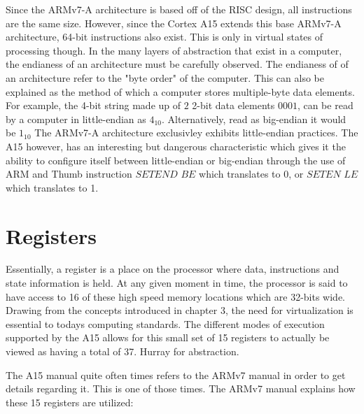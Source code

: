 \documentclass[12pt]{scrreprt}
\begin{document}
	Since the ARMv7-A architecture is based off of the RISC design, all instructions are the same size. However, since the Cortex A15 extends
	this base ARMv7-A architecture, 64-bit instructions also exist. This is only in virtual states of processing though.
	In the many layers of abstraction that exist in a computer, the endianess of an architecture must be carefully observed. The endianess of
	of an architecture refer to the "byte order" of the computer. This can also be explained as the method of which a computer stores
	multiple-byte data elements. For example, the 4-bit string made up of $2$ 2-bit data elements $0001$, can be read by a computer in little-endian as $4_{10}$. Alternatively, read as big-endian it would be $1_{10}$ The ARMv7-A architecture exclusivley exhibits little-endian practices. The A15 however, has an interesting but dangerous characteristic which gives it the ability to configure itself between little-endian or big-endian through the use of ARM and Thumb instruction $SETEND$ $BE$ which translates to 0, or $SETEN$ $LE$ which translates to 1.



{\let\clearpage\relax\chapter{Registers}}

	Essentially, a register is a place on the processor where data, instructions and state information is held.
	At any given moment in time, the processor is said to have access to 16 of these high speed memory locations which are 32-bits wide.
	Drawing from the concepts introduced in chapter 3, the need for virtualization is essential to todays computing standards.
	The different modes of execution supported by the A15 allows for this small set of 15 registers to actually be viewed as having a total of 37.
	Hurray for abstraction.

	The A15 manual quite often times refers to the ARMv7 manual in order to get details regarding it.
	This is one of those times.
	The ARMv7 manual explains how these 15 registers are utilized:
\end{document}
